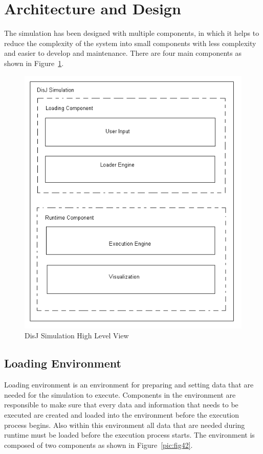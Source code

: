 \section{Architecture and Design}

The simulation has been designed with multiple components, in which it helps to reduce the complexity of the system into small components with less complexity and easier to develop and maintenance. There are four main components as shown in Figure~{\ref{pic:fig41}}.

\begin{figure}[ht!]
\includegraphics[width=1.0\textwidth,keepaspectratio]{./figure41}
\caption{DisJ Simulation High Level View}
\label{pic:fig41}
\end{figure}


\subsection{Loading Environment}

Loading environment is an environment for preparing and setting data that are needed for the simulation to execute. Components in the environment are responsible to make sure that every data and information that needs to be executed are created and loaded into the environment before the execution process begins. Also within this environment all data that are needed during runtime must be loaded before the execution process starts. The environment is composed of two components as shown in Figure~{\ref{pic:fig42}}.

